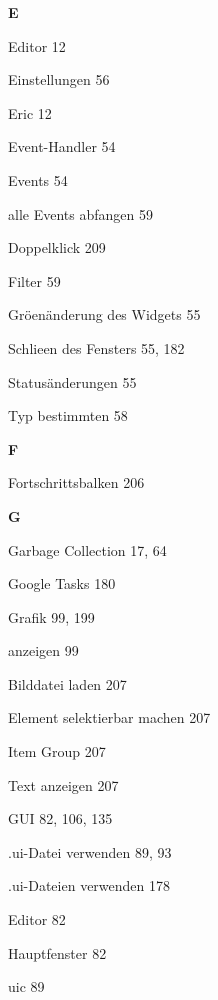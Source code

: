 \documentclass{book}
\renewcommand\indexspace{\vspace{11pt}}
\renewcommand\subitem{\par}
\begin{document}
\begin{multicols}{2}
\begin{osp-index}
  \indexspace
{\sffamily\bfseries E}\nopagebreak

  \item Editor\hspace{1mm} 12
  \item Einstellungen\hspace{1mm} 56
  \item Eric\hspace{1mm} 12
  \item Event-Handler\hspace{1mm} 54
  \item Events\hspace{1mm} 54
    \subitem alle Events abfangen\hspace{1mm} 59
    \subitem Doppelklick\hspace{1mm} 209
    \subitem Filter\hspace{1mm} 59
    \subitem Gr\"o\IeC {\ss }en\"anderung des Widgets\hspace{1mm} 55
    \subitem Schlie\IeC {\ss }en des Fensters\hspace{1mm} 55, 182
    \subitem Status\"anderungen\hspace{1mm} 55
    \subitem Typ bestimmten\hspace{1mm} 58

  \indexspace
{\sffamily\bfseries F}\nopagebreak

  \item Fortschrittsbalken\hspace{1mm} 206

  \indexspace
{\sffamily\bfseries G}\nopagebreak

  \item Garbage Collection\hspace{1mm} 17, 64
  \item Google Tasks\hspace{1mm} 180
  \item Grafik\hspace{1mm} 99, 199
    \subitem anzeigen\hspace{1mm} 99
    \subitem Bilddatei laden\hspace{1mm} 207
    \subitem Element selektierbar machen\hspace{1mm} 207
    \subitem Item Group\hspace{1mm} 207
    \subitem Text anzeigen\hspace{1mm} 207
  \item GUI\hspace{1mm} 82, 106, 135
    \subitem .ui-Datei verwenden\hspace{1mm} 89, 93
    \subitem .ui-Dateien verwenden\hspace{1mm} 178
    \subitem Editor\hspace{1mm} 82
    \subitem Hauptfenster\hspace{1mm} 82
    \subitem uic\hspace{1mm} 89


\end{osp-index}
\end{multicols}
\end{document}
